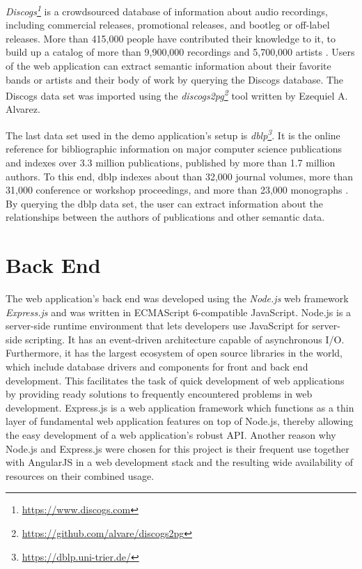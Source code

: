 \textit{Discogs\footnote{\url{https://www.discogs.com}}} is a crowdsourced database of information about audio recordings, including commercial releases, promotional releases, and bootleg or off-label releases. More than 415,000 people have contributed their knowledge to it, to build up a catalog of more than 9,900,000 recordings and 5,700,000 artists \cite{discogs-about}. Users of the web application can extract semantic information about their favorite bands or artists and their body of work by querying the Discogs database. The Discogs data set was imported using the \textit{discogs2pg\footnote{\url{https://github.com/alvare/discogs2pg}}} tool written by Ezequiel A. Alvarez.

The last data set used in the demo application's setup is \textit{dblp\footnote{\url{https://dblp.uni-trier.de/}}}. It is the online reference for bibliographic information on major computer science publications and indexes over 3.3 million publications, published by more than 1.7 million authors. To this end, dblp indexes about than 32,000 journal volumes, more than 31,000 conference or workshop proceedings, and more than 23,000 monographs \cite{dblp-about}. By querying the dblp data set, the user can extract information about the relationships between the authors of publications and other semantic data.

\section{Back End}
The web application's back end was developed using the \textit{Node.js} web framework \textit{Express.js} and was written in ECMAScript 6-compatible JavaScript. Node.js is a server-side runtime environment	that lets developers use JavaScript for server-side scripting. It has an event-driven architecture capable of asynchronous I/O. Furthermore, it has the largest ecosystem of open source libraries in the world, which include database drivers and components for front and back end development. This facilitates the task of quick development of web applications by providing ready solutions to frequently encountered problems in web development. Express.js is a web application framework which functions as a thin layer of fundamental web application features on top of Node.js, thereby allowing the easy development of a web application's robust API. Another reason why Node.js and Express.js were chosen for this project is their frequent use together with AngularJS in a web development stack and the resulting wide availability of resources on their combined usage.

